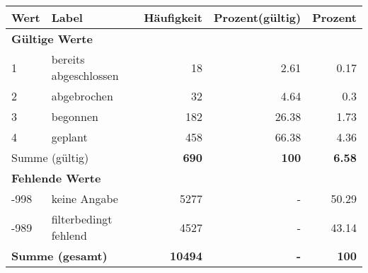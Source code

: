      \begin{longtable}{lXrrr}
     \toprule
     \textbf{Wert} & \textbf{Label} & \textbf{Häufigkeit} & \textbf{Prozent(gültig)} & \textbf{Prozent} \\
     \endhead
     \midrule
     \multicolumn{5}{l}{\textbf{Gültige Werte}}\\

     1 &
     \multicolumn{1}{X}{ bereits abgeschlossen   } &


       \num{18} &
       \num[round-mode=places,round-precision=2]{2,61} &
         \num[round-mode=places,round-precision=2]{0,17} \\

     2 &
     \multicolumn{1}{X}{ abgebrochen   } &


       \num{32} &
       \num[round-mode=places,round-precision=2]{4,64} &
         \num[round-mode=places,round-precision=2]{0,3} \\

     3 &
     \multicolumn{1}{X}{ begonnen   } &


       \num{182} &
       \num[round-mode=places,round-precision=2]{26,38} &
         \num[round-mode=places,round-precision=2]{1,73} \\

     4 &
     \multicolumn{1}{X}{ geplant   } &


       \num{458} &
       \num[round-mode=places,round-precision=2]{66,38} &
         \num[round-mode=places,round-precision=2]{4,36} \\
     \midrule
     \multicolumn{2}{l}{Summe (gültig)} &
       \textbf{\num{690}} &
     \textbf{100} &
       \textbf{\num[round-mode=places,round-precision=2]{6,58}} \\
     \multicolumn{5}{l}{\textbf{Fehlende Werte}}\\
       -998 &
       keine Angabe &
         \num{5277} &
        - &
         \num[round-mode=places,round-precision=2]{50,29} \\
       -989 &
       filterbedingt fehlend &
         \num{4527} &
        - &
         \num[round-mode=places,round-precision=2]{43,14} \\
     \midrule
     \multicolumn{2}{l}{\textbf{Summe (gesamt)}} &
          \textbf{\num{10494}} &
        \textbf{-} &
        \textbf{100} \\
     \bottomrule
     \end{longtable}
     
